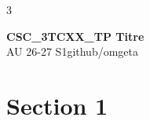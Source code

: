 \documentclass[12pt, a4paper]{article}
\newcommand{\mytitle}{CSC\_3TCXX\_TP Titre}
\newcommand{\myauthor}{github/omgeta}
\newcommand{\mydate}{AU 26-27 S1}
\begin{document}
\raggedright
\footnotesize
\begin{multicols*}{3}
\setlength{\premulticols}{1pt}
\setlength{\postmulticols}{1pt}
\setlength{\multicolsep}{1pt}
\setlength{\columnsep}{2pt}

{\normalsize{\textbf{\mytitle}}}\\
{\footnotesize{\mydate\hspace{2pt}\textemdash\hspace{2pt}\myauthor}}
\section{Section 1}
\end{multicols*}
\end{document}
